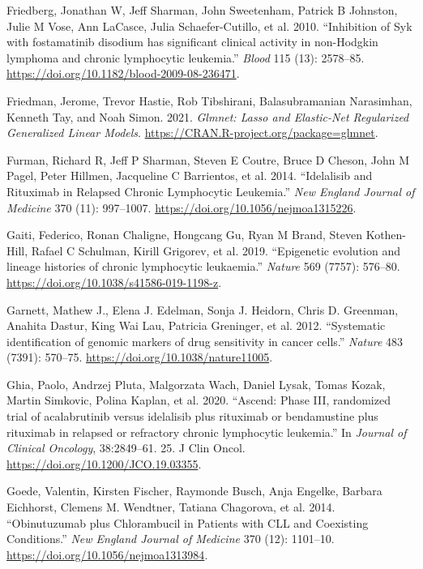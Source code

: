 \documentclass[11pt, a4paper, twosided]{book}
\newenvironment{CSLReferences}%
  {}%
  {\par}
\begin{document}
\begin{CSLReferences}{1}{0}
\leavevmode{}%
Friedberg, Jonathan W, Jeff Sharman, John Sweetenham, Patrick B Johnston, Julie M Vose, Ann LaCasce, Julia Schaefer-Cutillo, et al. 2010. {``{Inhibition of Syk with fostamatinib disodium has significant clinical activity in non-Hodgkin lymphoma and chronic lymphocytic leukemia}.''} \emph{Blood} 115 (13): 2578--85. \url{https://doi.org/10.1182/blood-2009-08-236471}.

\leavevmode{}%
Friedman, Jerome, Trevor Hastie, Rob Tibshirani, Balasubramanian Narasimhan, Kenneth Tay, and Noah Simon. 2021. \emph{Glmnet: Lasso and Elastic-Net Regularized Generalized Linear Models}. \url{https://CRAN.R-project.org/package=glmnet}.

\leavevmode{}%
Furman, Richard R, Jeff P Sharman, Steven E Coutre, Bruce D Cheson, John M Pagel, Peter Hillmen, Jacqueline C Barrientos, et al. 2014. {``{Idelalisib and Rituximab in Relapsed Chronic Lymphocytic Leukemia}.''} \emph{New England Journal of Medicine} 370 (11): 997--1007. \url{https://doi.org/10.1056/nejmoa1315226}.

\leavevmode{}%
Gaiti, Federico, Ronan Chaligne, Hongcang Gu, Ryan M Brand, Steven Kothen-Hill, Rafael C Schulman, Kirill Grigorev, et al. 2019. {``{Epigenetic evolution and lineage histories of chronic lymphocytic leukaemia}.''} \emph{Nature} 569 (7757): 576--80. \url{https://doi.org/10.1038/s41586-019-1198-z}.

\leavevmode{}%
Garnett, Mathew J., Elena J. Edelman, Sonja J. Heidorn, Chris D. Greenman, Anahita Dastur, King Wai Lau, Patricia Greninger, et al. 2012. {``{Systematic identification of genomic markers of drug sensitivity in cancer cells}.''} \emph{Nature} 483 (7391): 570--75. \url{https://doi.org/10.1038/nature11005}.

\leavevmode{}%
Ghia, Paolo, Andrzej Pluta, Malgorzata Wach, Daniel Lysak, Tomas Kozak, Martin Simkovic, Polina Kaplan, et al. 2020. {``{Ascend: Phase III, randomized trial of acalabrutinib versus idelalisib plus rituximab or bendamustine plus rituximab in relapsed or refractory chronic lymphocytic leukemia}.''} In \emph{Journal of Clinical Oncology}, 38:2849--61. 25. J Clin Oncol. \url{https://doi.org/10.1200/JCO.19.03355}.

\leavevmode{}%
Goede, Valentin, Kirsten Fischer, Raymonde Busch, Anja Engelke, Barbara Eichhorst, Clemens M. Wendtner, Tatiana Chagorova, et al. 2014. {``{Obinutuzumab plus Chlorambucil in Patients with CLL and Coexisting Conditions}.''} \emph{New England Journal of Medicine} 370 (12): 1101--10. \url{https://doi.org/10.1056/nejmoa1313984}.


\end{CSLReferences}
\end{document}
